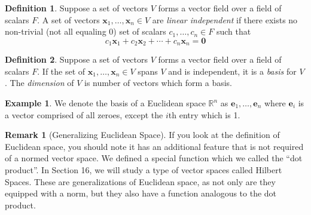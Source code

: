 \documentclass{article}
\newcommand{\R}{\mathbb{R}}
\newcommand{\x}{\mathbf{x}}
\theoremstyle{definition}
\newtheorem{definition}{Definition}[section]
\newtheorem{example}{Example}[section]
\newtheorem{remark}{Remark}[section]
\begin{document}
\begin{definition}
	Suppose a set of vectors $ V $ forms a vector field over a field of scalars $ F $. A set of vectors $ \x_1,\ldots,\x_n\in V $ are \textit{\color{red}linear independent} if there exists no non-trivial (not all equaling $ 0 $) set of scalars $ c_1,\ldots,c_n\in F $ such that $$ c_1\x_1 + c_2\x_2 +\cdots + c_n\x_n  = \mathbf{0}$$
\end{definition}
\begin{definition}
	Suppose a set of vectors $ V $ forms a vector field over a field of scalars $ F $. If the set of $ \x_1,\ldots,\x_n\in V $ spans $ V $ and is independent, it is a \textit{\color{red}basis} for $ V $. The \textit{\color{red} dimension} of $ V $ is number of vectors which form a basis. 
\end{definition}
\begin{example}
	We denote the basis of a Euclidean space $ \R^n $ as $ {\mathbf e_1,\ldots,\mathbf e_n} $ where $ \mathbf{e}_i $ is a vector comprised of all zeroes, except the $ i $th entry which is 1. 
\end{example}
\begin{remark}[Generalizing Euclidean Space]
If you look at the definition of Euclidean space, you should note it has an additional feature that is not required of a normed vector space. We defined a special function which we called the ``dot product''. In Section 16, we will study a type of vector spaces called Hilbert Spaces. These are 
generalizations of Euclidean space, as not only are they equipped with a norm, but they also have a function analogous to the dot product. 
\end{remark}
\end{document}
